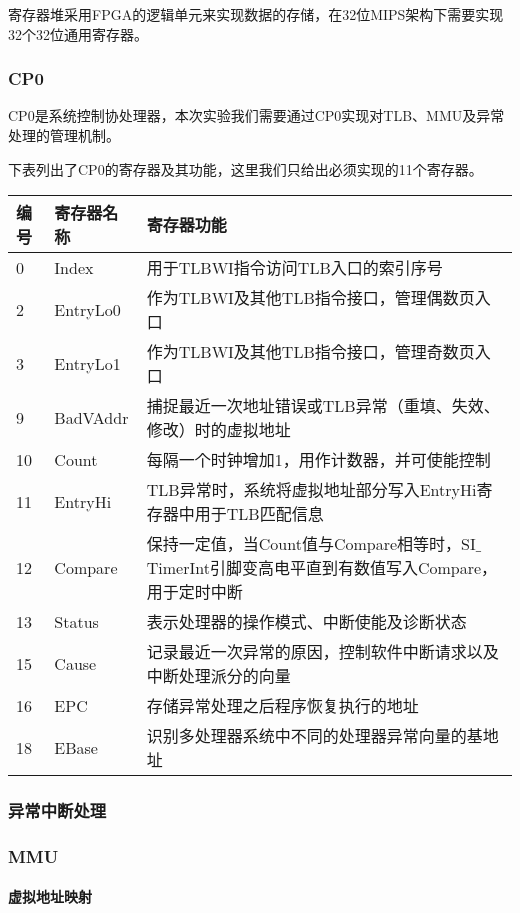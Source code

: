 寄存器堆采用FPGA的逻辑单元来实现数据的存储，在32位MIPS架构下需要实现32个32位通用寄存器。

\subsubsection{CP0}
CP0是系统控制协处理器，本次实验我们需要通过CP0实现对TLB、MMU及异常处理的管理机制。

下表列出了CP0的寄存器及其功能，这里我们只给出必须实现的11个寄存器。

\begin{table}[H]
\centering
\begin{tabular}{lll}
\hline
编号&寄存器名称&寄存器功能\\
\hline
0&Index&用于TLBWI指令访问TLB入口的索引序号\\
2&EntryLo0&作为TLBWI及其他TLB指令接口，管理偶数页入口\\
3&EntryLo1&作为TLBWI及其他TLB指令接口，管理奇数页入口\\
9&BadVAddr&捕捉最近一次地址错误或TLB异常（重填、失效、修改）时的虚拟地址\\
10&Count&每隔一个时钟增加1，用作计数器，并可使能控制\\
11&EntryHi&TLB异常时，系统将虚拟地址部分写入EntryHi寄存器中用于TLB匹配信息\\
12&Compare&保持一定值，当Count值与Compare相等时，SI$\_$TimerInt引脚变高电平直到有数值写入Compare，用于定时中断\\
13&Status&表示处理器的操作模式、中断使能及诊断状态\\
15&Cause&记录最近一次异常的原因，控制软件中断请求以及中断处理派分的向量\\
16&EPC&存储异常处理之后程序恢复执行的地址\\
18&EBase&识别多处理器系统中不同的处理器异常向量的基地址\\
\hline
\end{tabular}
\end{table}

\subsubsection{异常中断处理}
\subsubsection{MMU}
\paragraph{虚拟地址映射}
